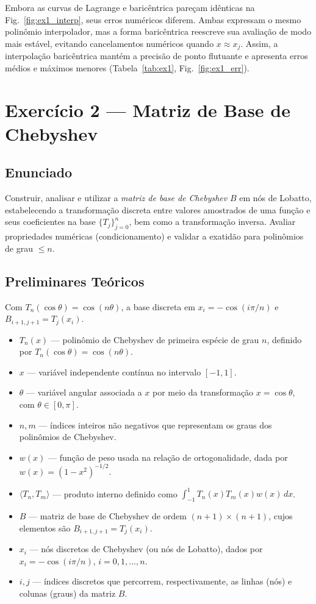 \documentclass[11pt,a4paper]{article}
\begin{document}
Embora as curvas de Lagrange e baricêntrica pareçam idênticas na Fig.~\ref{fig:ex1_interp}, 
seus erros numéricos diferem. Ambas expressam o mesmo polinômio interpolador, 
mas a forma baricêntrica reescreve sua avaliação de modo mais estável, evitando cancelamentos 
numéricos quando $x \approx x_j$. Assim, a interpolação baricêntrica mantém a precisão de ponto 
flutuante e apresenta erros médios e máximos menores (Tabela~\ref{tab:ex1}, 
Fig.~\ref{fig:ex1_err}).

\section{Exercício 2 --- Matriz de Base de Chebyshev}

\subsection*{Enunciado}
Construir, analisar e utilizar a \emph{matriz de base de Chebyshev} $B$ em nós de Lobatto, estabelecendo a transformação discreta entre valores amostrados de uma função e seus coeficientes na base $\{T_j\}_{j=0}^n$, bem como a transformação inversa. Avaliar propriedades numéricas (condicionamento) e validar a exatidão para polinômios de grau $\le n$.

\subsection*{Preliminares Teóricos}

Com $T_n(\cos\theta)=\cos(n\theta)$, a base discreta em $x_i=-\cos(i\pi/n)$ e $B_{i+1,j+1}=T_j(x_i)$.

\begin{itemize}
  \item $T_n(x)$ --- polinômio de Chebyshev de primeira espécie de grau $n$, definido por $T_n(\cos\theta) = \cos(n\theta)$.
  \item $x$ --- variável independente contínua no intervalo $[-1, 1]$.
  \item $\theta$ --- variável angular associada a $x$ por meio da transformação $x = \cos\theta$, com $\theta \in [0, \pi]$.
  \item $n, m$ --- índices inteiros não negativos que representam os graus dos polinômios de Chebyshev.
  \item $w(x)$ --- função de peso usada na relação de ortogonalidade, dada por $w(x) = (1 - x^2)^{-1/2}$.
  \item $\langle T_n, T_m \rangle$ --- produto interno definido como $\displaystyle \int_{-1}^1 T_n(x)T_m(x)w(x)\,dx$.
  \item $B$ --- matriz de base de Chebyshev de ordem $(n{+}1)\times(n{+}1)$, cujos elementos são $B_{i+1,j+1} = T_j(x_i)$.
  \item $x_i$ --- nós discretos de Chebyshev (ou nós de Lobatto), dados por $x_i = -\cos(i\pi/n)$, $i=0,1,\dots,n$.
  \item $i, j$ --- índices discretos que percorrem, respectivamente, as linhas (nós) e colunas (graus) da matriz $B$.
\end{itemize}
\end{document}
